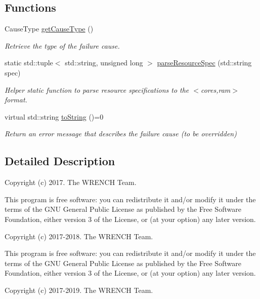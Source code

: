 \subsection*{Functions}
\begin{DoxyCompactItemize}
\item 
Cause\+Type \hyperlink{namespacewrench_aa48af8274224242d74259631a6b6b23a}{get\+Cause\+Type} ()
\begin{DoxyCompactList}\small\item\em Retrieve the type of the failure cause. \end{DoxyCompactList}\item 
static std\+::tuple$<$ std\+::string, unsigned long $>$ \hyperlink{namespacewrench_a9601a7728120192951232d2e0a74a483}{parse\+Resource\+Spec} (std\+::string spec)
\begin{DoxyCompactList}\small\item\em Helper static function to parse resource specifications to the $<$cores,ram$>$ format. \end{DoxyCompactList}\item 
virtual std\+::string \hyperlink{namespacewrench_a12c0e5148c72aa18e5e9119514a2d100}{to\+String} ()=0
\begin{DoxyCompactList}\small\item\em Return an error message that describes the failure cause (to be overridden) \end{DoxyCompactList}\end{DoxyCompactItemize}


\subsection{Detailed Description}
Copyright (c) 2017. The W\+R\+E\+N\+CH Team.

This program is free software\+: you can redistribute it and/or modify it under the terms of the G\+NU General Public License as published by the Free Software Foundation, either version 3 of the License, or (at your option) any later version.

Copyright (c) 2017-\/2018. The W\+R\+E\+N\+CH Team.

This program is free software\+: you can redistribute it and/or modify it under the terms of the G\+NU General Public License as published by the Free Software Foundation, either version 3 of the License, or (at your option) any later version.

Copyright (c) 2017-\/2019. The W\+R\+E\+N\+CH Team.

